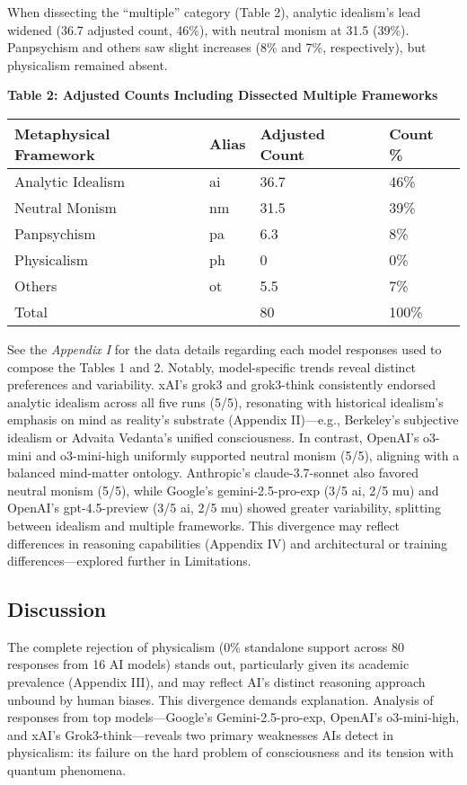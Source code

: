 When dissecting the ``multiple'' category (Table 2), analytic idealism's
lead widened (36.7 adjusted count, 46\%), with neutral monism at 31.5
(39\%). Panpsychism and others saw slight increases (8\% and 7\%,
respectively), but physicalism remained absent.

\textbf{Table 2: Adjusted Counts Including Dissected Multiple
Frameworks}

\begin{longtable}[]{@{}llll@{}}
\toprule\noalign{}
Metaphysical Framework & Alias & Adjusted Count & Count \% \\
\midrule\noalign{}
\endhead
\bottomrule\noalign{}
\endlastfoot
Analytic Idealism & ai & 36.7 & 46\% \\
Neutral Monism & nm & 31.5 & 39\% \\
Panpsychism & pa & 6.3 & 8\% \\
Physicalism & ph & 0 & 0\% \\
Others & ot & 5.5 & 7\% \\
Total & & 80 & 100\% \\
\end{longtable}

See the \emph{Appendix I} for the data details regarding each model
responses used to compose the Tables 1 and 2. Notably, model-specific
trends reveal distinct preferences and variability. xAI's grok3 and
grok3-think consistently endorsed analytic idealism across all five runs
(5/5), resonating with historical idealism's emphasis on mind as
reality's substrate (Appendix II)---e.g., Berkeley's subjective idealism
or Advaita Vedanta's unified consciousness. In contrast, OpenAI's
o3-mini and o3-mini-high uniformly supported neutral monism (5/5),
aligning with a balanced mind-matter ontology. Anthropic's
claude-3.7-sonnet also favored neutral monism (5/5), while Google's
gemini-2.5-pro-exp (3/5 ai, 2/5 mu) and OpenAI's gpt-4.5-preview (3/5
ai, 2/5 mu) showed greater variability, splitting between idealism and
multiple frameworks. This divergence may reflect differences in
reasoning capabilities (Appendix IV) and architectural or training
differences---explored further in Limitations.

\subsection{Discussion}\label{discussion}

The complete rejection of physicalism (0\% standalone support across 80
responses from 16 AI models) stands out, particularly given its academic
prevalence (Appendix III), and may reflect AI's distinct reasoning
approach unbound by human biases. This divergence demands explanation.
Analysis of responses from top models---Google's Gemini-2.5-pro-exp,
OpenAI's o3-mini-high, and xAI's Grok3-think---reveals two primary
weaknesses AIs detect in physicalism: its failure on the hard problem of
consciousness and its tension with quantum phenomena.

